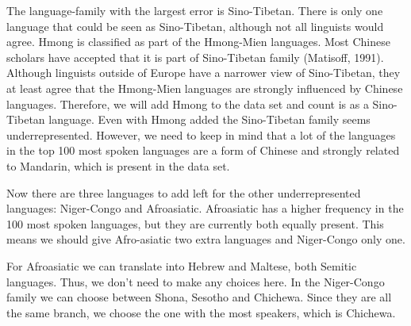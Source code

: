 The language-family with the largest error is Sino-Tibetan. There is only one language that could be seen as Sino-Tibetan, although not all linguists would agree. Hmong is classified as part of the Hmong-Mien languages. Most Chinese scholars have accepted that it is part of Sino-Tibetan family (Matisoff, 1991). Although linguists outside of Europe have a narrower view of Sino-Tibetan, they at least agree that the Hmong-Mien languages are strongly influenced by Chinese languages. Therefore, we will add Hmong to the data set and count is as a Sino-Tibetan language. Even with Hmong added the Sino-Tibetan family seems underrepresented. However, we need to keep in mind that a lot of the languages in the top 100 most spoken languages are a form of Chinese and strongly related to Mandarin, which is present in the data set. 

Now there are three languages to add left for the other underrepresented languages: Niger-Congo and Afroasiatic. Afroasiatic has a higher frequency in the 100 most spoken languages, but they are currently both equally present. This means we should give Afro-asiatic two extra languages and Niger-Congo only one.  

For Afroasiatic we can translate into Hebrew and Maltese, both Semitic languages. Thus, we don’t need to make any choices here. In the Niger-Congo family we can choose between Shona, Sesotho and Chichewa. Since they are all the same branch, we choose the one with the most speakers, which is Chichewa.   

